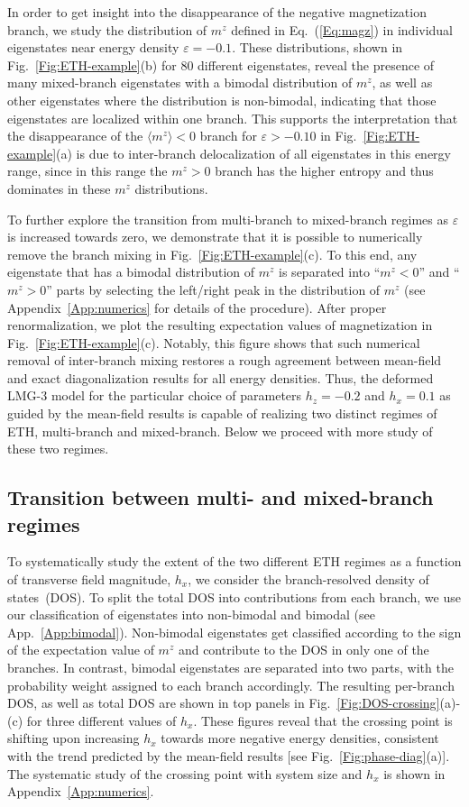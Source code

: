 \documentclass[aps,prx,showpacs,amsmath,amssymb,superscriptaddress,twocolumn,longbibliography,10pt,nofootinbib]{revtex4-2}
\begin{document}
In order to get insight into the disappearance of the negative magnetization branch, we study the distribution of $m^z$ defined in Eq.~(\ref{Eq:magz}) in individual eigenstates near energy density $\varepsilon=-0.1$. These distributions, shown in Fig.~\ref{Fig:ETH-example}(b) for 80 different eigenstates, reveal the presence of many mixed-branch eigenstates with a bimodal distribution of $m^z$, as well as other eigenstates where the distribution is non-bimodal, indicating that those eigenstates are localized within one branch. This supports the interpretation that the disappearance of the $\langle m^z\rangle<0$ branch for $\varepsilon > -0.10$ in Fig.~\ref{Fig:ETH-example}(a) is due to inter-branch delocalization of all eigenstates in this energy range, since in this range the $m^z>0$ branch has the higher entropy and thus dominates in these $m^z$ distributions.

To further explore the transition from multi-branch to mixed-branch regimes as $\varepsilon$ is increased towards zero, we demonstrate that it is possible to numerically remove the branch mixing in Fig.~\ref{Fig:ETH-example}(c).  To this end, any eigenstate that has a bimodal distribution of $m^z$ is separated into   ``$m^z<0$'' and  ``$m^z>0$'' parts by selecting the left/right peak in the distribution of $m^z$ (see Appendix~\ref{App:numerics} for details of the procedure). After proper renormalization, we plot the resulting expectation values of magnetization in Fig.~\ref{Fig:ETH-example}(c). Notably, this figure shows that such numerical removal of inter-branch mixing restores a rough agreement between mean-field and exact diagonalization results for all energy densities.  Thus, the deformed LMG-3 model for the particular choice of parameters $h_z=-0.2$ and $h_x=0.1$ as guided by the mean-field results is capable of realizing two distinct regimes of ETH, multi-branch and mixed-branch.  Below we proceed with more study of these two regimes. 

\subsection{Transition between multi- and mixed-branch regimes}
To systematically study the extent of the two different ETH regimes as a function of transverse field magnitude, $h_x$, we consider the branch-resolved density of states~(DOS). To split the total DOS into contributions from each branch, we use our classification of eigenstates into non-bimodal and bimodal (see App.~\ref{App:bimodal}). Non-bimodal eigenstates get classified according to the sign of the expectation value of $m^z$ and contribute to the DOS in only one of the branches. In contrast, bimodal eigenstates are separated into two parts, with the probability weight assigned to each branch accordingly. The resulting  per-branch DOS, as well as total DOS are shown in top panels in Fig.~\ref{Fig:DOS-crossing}(a)-(c) for three different values of $h_x$. These figures reveal that the crossing point is shifting upon increasing  $h_x$ towards more negative energy densities, consistent with the trend predicted by the mean-field results [see Fig.~\ref{Fig:phase-diag}(a)].  The systematic study of the crossing point with system size and $h_x$ is shown in Appendix~\ref{App:numerics}. 
\end{document}
